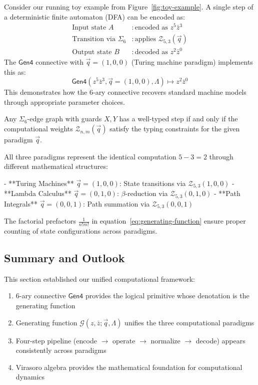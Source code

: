 \begin{example}
\label{ex:dfa-reduction}
Consider our running toy example from Figure~\ref{fig:toy-example}. A single step of a deterministic finite automaton (DFA) can be encoded as:
\begin{align}
\text{Input state } A &: \text{encoded as } z^5 \bar{z}^3 \\
\text{Transition via } \Sigma_6 &: \text{applies } \mathcal{Z}_{5,3}(\vec{q}) \\
\text{Output state } B &: \text{decoded as } z^2 \bar{z}^0
\end{align}
The $\mathsf{Gen4}$ connective with $\vec{q} = (1,0,0)$ (Turing machine paradigm) implements this as:
\[
\mathsf{Gen4}(z^5\bar{z}^3, \vec{q}=(1,0,0), \Lambda) \mapsto z^2\bar{z}^0
\]
This demonstrates how the 6-ary connective recovers standard machine models through appropriate parameter choices.
\end{example}

\begin{lemma}
\label{lem:well-typed-steps}
Any $\Sigma_6$-edge graph with guards $X,Y$ has a well-typed step if and only if the computational weights $\mathcal{Z}_{n,m}(\vec{q})$ satisfy the typing constraints for the given paradigm $\vec{q}$.
\end{lemma}

All three paradigms represent the identical computation $5-3=2$ through different mathematical structures:

- **Turing Machines** $\vec{q} = (1,0,0)$: State transitions via $\mathcal{Z}_{5,3}(1,0,0)$
- **Lambda Calculus** $\vec{q} = (0,1,0)$: $\beta$-reduction via $\mathcal{Z}_{5,3}(0,1,0)$  
- **Path Integrals** $\vec{q} = (0,0,1)$: Path summation via $\mathcal{Z}_{5,3}(0,0,1)$

The factorial prefactors $\frac{1}{n!m!}$ in equation~\eqref{eq:generating-function} ensure proper counting of state configurations across paradigms.

\subsection{Summary and Outlook}

This section established our unified computational framework:

\begin{enumerate}
\item 6-ary connective $\mathsf{Gen4}$ provides the logical primitive whose denotation is the generating function
\item Generating function $\mathcal{G}(z, \bar{z}; \vec{q}, \Lambda)$ unifies the three computational paradigms
\item Four-step pipeline (encode $\to$ operate $\to$ normalize $\to$ decode) appears consistently across paradigms
\item Virasoro algebra provides the mathematical foundation for computational dynamics
\end{enumerate}

